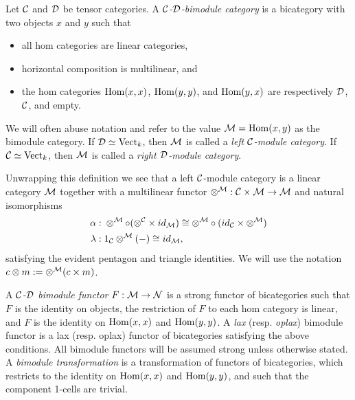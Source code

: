 \documentclass{amsart}
\begin{document}
\begin{definition}
	Let $\mathcal C$ and $\mathcal D$ be tensor categories. A {\em $\mathcal C$-$\mathcal D$-bimodule category} is a bicategory with two objects $x$ and $y$ such that
	\begin{itemize}
		\item all hom categories are linear categories, 
		\item horizontal composition is multilinear, and
		\item the hom categories $\operatorname{Hom}(x,x)$, $\operatorname{Hom}(y,y)$, and $\operatorname{Hom}(y,x)$ are respectively $\mathcal D$, $\mathcal C$, and empty.
	\end{itemize}
	We will often abuse notation and refer to the value $\mathcal M = \operatorname{Hom}(x,y)$ as the bimodule category. If $\mathcal D \simeq \mathrm{Vect}_k$, then $\mathcal M$ is called a {\em left $\mathcal C$-module category}. If $\mathcal C \simeq \mathrm{Vect}_k$, then $\mathcal M$ is called a {\em right $\mathcal D$-module category}.
\end{definition}
	
Unwrapping this definition we see that a left $\mathcal C$-module category is a linear category $\mathcal M$ together with a multilinear functor $\otimes^{\mathcal M}: \mathcal C \times \mathcal M \to \mathcal M$ and natural isomorphisms
	\begin{align*}
		\alpha: & \;    \otimes^{\mathcal M} \circ (\otimes^{\mathcal C} \times id_{\mathcal M}) \cong  \otimes^{\mathcal M} \circ (id_{\mathcal C} \times \otimes^{\mathcal M}) \\
		\lambda: & \; 1_{\mathcal C} \otimes^{\mathcal M}(-) \cong id_{\mathcal M},
	\end{align*}
	satisfying the evident pentagon and triangle identities.  We will use the notation $c \otimes m := \otimes^\mathcal M(c \times m)$.

\begin{definition}		
A {\em $\mathcal C$-$\mathcal D$ bimodule functor} $F:\mathcal M \to \mathcal N$ is a strong functor of bicategories such that 
		 $F$ is the identity on objects,
		  the restriction of $F$ to each hom category is linear,
		 and $F$ is the identity on $\operatorname{Hom}(x,x)$ and $\operatorname{Hom}(y,y)$.
A {\em lax} (resp. {\em oplax}) bimodule functor is a lax (resp. oplax) functor of bicategories satisfying the above conditions. All bimodule functors will be assumed strong unless otherwise stated. 
	A {\em bimodule transformation} is a transformation of functors of bicategories, which restricts to the identity on $\operatorname{Hom}(x,x)$ and $\operatorname{Hom}(y,y)$, and such that the component 1-cells are trivial.  
\end{definition} %
	
\end{document}
